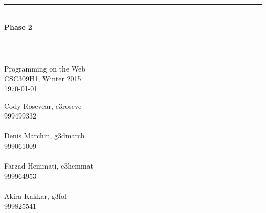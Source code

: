 \documentclass[12pt]{article}
\begin{document}
\begin{titlepage}


\newcommand{\HRule}{\rule{\linewidth}{0.5mm}} %

\center %
 



\HRule \\[0.4cm]
{ \huge \bfseries Phase 2}\\[0.4cm] %
\HRule \\[1.5cm]
 
\begin{minipage}{0.4\textwidth}
\begin{center} \large
Programming on the Web\\
CSC309H1, Winter 2015\\
\today
\end{center}
\end{minipage}


\vfill %


Cody Rosevear, c3roseve\\
999499332\\
\\
Denis Marchin, g3dmarch\\
999061009\\
\\
Farzad Hemmati, c3hemmat\\
999964953\\
\\


Akira Kakkar, g3fol\\
999825541\\
\\



\end{titlepage}
\newpage
\end{document}
